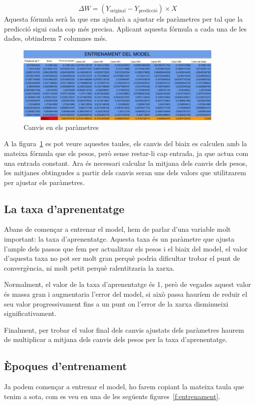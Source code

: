 $$\Delta W = (Y_{\text{original}} - Y_{\text{predicció}}) \times X$$
Aquesta fórmula serà la que ens ajudarà a ajustar els paràmetres per tal que la predicció sigui cada cop més precisa. Aplicant aquesta fórmula a cada una de les dades, obtindrem 7 columnes més.

\begin{figure}[h!]
    \centering
    \includegraphics[width=0.9\textwidth]{./figures/Canvis.png}
    \caption{Canvis en els paràmetres}
    \label{f:canvisParametres}
\end{figure}

A la figura~\ref{f:canvisParametres} es pot veure aquestes taules, els canvis del biaix es calculen amb la mateixa fórmula que els pesos, però sense restar-li cap entrada, ja que actua com una entrada constant.
Ara és necessari calcular la mitjana dels canvis dels pesos, les mitjanes obtingudes a partir dels canvis seran uns dels valors que utilitzarem per ajustar els paràmetres.

\subsection{La taxa d'aprenentatge}
Abans de començar a entrenar el model, hem de parlar d'una variable molt important: la taxa d'aprenentatge. Aquesta taxa és un paràmetre que ajusta l'ample dels passos que fem per actualitzar els pesos i el biaix del model, el valor d'aquesta taxa no pot ser molt gran perquè podria dificultar trobar el punt de convergència, ni molt petit perquè ralentitzaria la xarxa.

Normalment, el valor de la taxa d'aprenentatge és 1, però de vegades aquest valor és massa gran i augmentaria l'error del model, si això passa hauríem de reduir el seu valor progressivament fins a un punt on l'error de la xarxa disminueixi significativament.

Finalment, per trobar el valor final dels canvis ajustats dels paràmetres haurem de multiplicar a mitjana dels canvis dels pesos per la taxa d'aprenentatge.

\subsection{Èpoques d'entrenament}
Ja podem començar a entrenar el model, ho farem copiant la mateixa taula que tenim a sota, com es veu en una de les següents figures~\ref{f:entrenament}.

